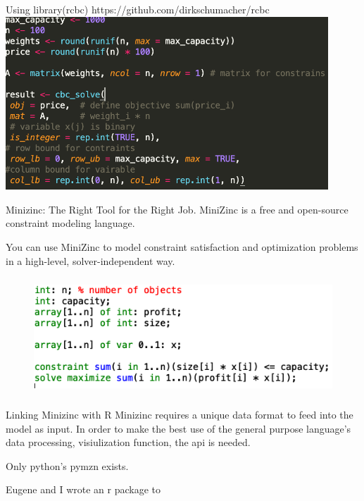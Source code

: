 \documentclass[xcolor=dvipsnames,aspectratio=169]{beamer}
\begin{document}
\begin{frame}{Using library(rcbc)}
https://github.com/dirkschumacher/rcbc
 \includegraphics[height =6.5cm]{knapsack.png}
\end{frame}



\begin{frame}{Minizinc: The Right Tool for the Right Job.}
MiniZinc is a free and open-source constraint modeling language.

You can use MiniZinc to model constraint 
satisfaction and optimization problems in a 
high-level, solver-independent way.

\begin{figure}
    \centering
\includegraphics[height =4.4cm]{Minizinc_knapsack.png}
    \label{fig:minizinc}
\end{figure}
 
\end{frame}


\begin{frame}{Linking Minizinc with R}
Minizinc requires a unique data format to feed into the model as 
input. 
In order to make the best use of the general purpose language's data
processing, visiulization function, the api is needed.

Only python's pymzn exists.

Eugene and I wrote an r package to 
\end{frame}
\end{document}

